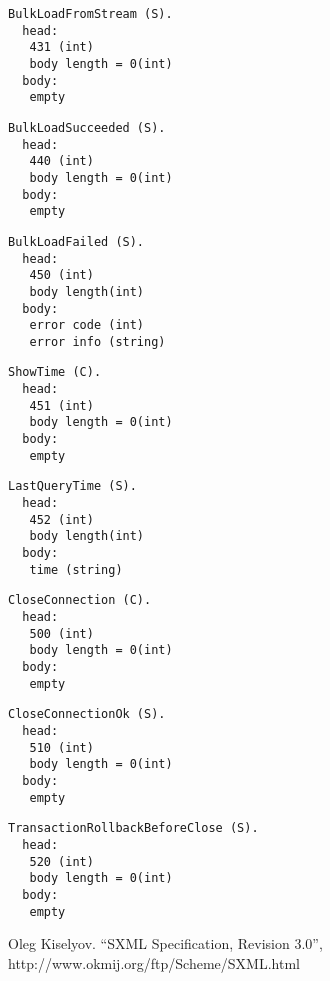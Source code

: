 \documentclass[a4paper,12pt]{article}
\begin{document}
\begin{verbatim}
BulkLoadFromStream (S).
  head:
   431 (int)
   body length = 0(int)
  body:
   empty
\end{verbatim}

\begin{verbatim}
BulkLoadSucceeded (S).
  head:
   440 (int)
   body length = 0(int)
  body:
   empty
\end{verbatim}

\begin{verbatim}
BulkLoadFailed (S).
  head:
   450 (int)
   body length(int)
  body:
   error code (int)
   error info (string)
\end{verbatim}

\begin{verbatim}
ShowTime (C).
  head:
   451 (int)
   body length = 0(int)
  body:
   empty
\end{verbatim}

\begin{verbatim}
LastQueryTime (S).
  head:
   452 (int)
   body length(int)
  body:
   time (string)
\end{verbatim}

\begin{verbatim}
CloseConnection (C).
  head:
   500 (int)
   body length = 0(int)
  body:
   empty
\end{verbatim}

\begin{verbatim}
CloseConnectionOk (S).
  head:
   510 (int)
   body length = 0(int)
  body:
   empty
\end{verbatim}

\begin{verbatim}
TransactionRollbackBeforeClose (S).
  head:
   520 (int)
   body length = 0(int)
  body:
   empty
\end{verbatim}

\begin{thebibliography}{1}

Oleg Kiselyov.
``SXML Specification, Revision 3.0'',
http://www.okmij.org/ftp/Scheme/SXML.html
\end{thebibliography}
\end{document}
